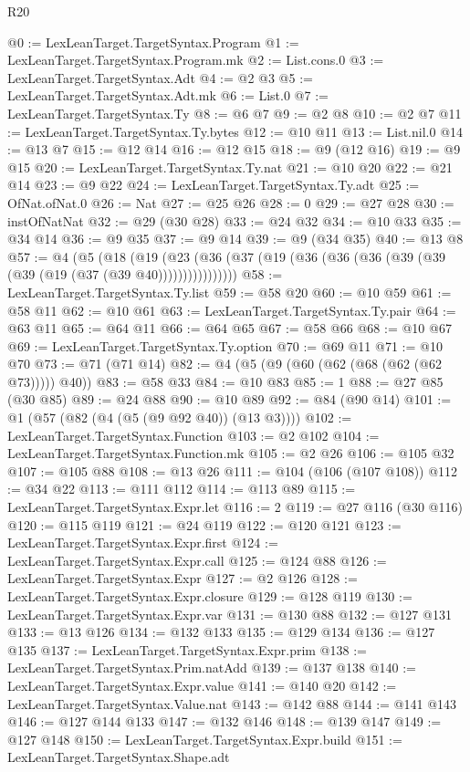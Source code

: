 \begin{lexlean}{R20}
\begin{coremodule}
@0 := LexLeanTarget.TargetSyntax.Program
@1 := LexLeanTarget.TargetSyntax.Program.mk
@2 := List.cons.{0}
@3 := LexLeanTarget.TargetSyntax.Adt
@4 := @2 @3
@5 := LexLeanTarget.TargetSyntax.Adt.mk
@6 := List.{0}
@7 := LexLeanTarget.TargetSyntax.Ty
@8 := @6 @7
@9 := @2 @8
@10 := @2 @7
@11 := LexLeanTarget.TargetSyntax.Ty.bytes
@12 := @10 @11
@13 := List.nil.{0}
@14 := @13 @7
@15 := @12 @14
@16 := @12 @15
@18 := @9 (@12 @16)
@19 := @9 @15
@20 := LexLeanTarget.TargetSyntax.Ty.nat
@21 := @10 @20
@22 := @21 @14
@23 := @9 @22
@24 := LexLeanTarget.TargetSyntax.Ty.adt
@25 := OfNat.ofNat.{0}
@26 := Nat
@27 := @25 @26
@28 := 0
@29 := @27 @28
@30 := instOfNatNat
@32 := @29 (@30 @28)
@33 := @24 @32
@34 := @10 @33
@35 := @34 @14
@36 := @9 @35
@37 := @9 @14
@39 := @9 (@34 @35)
@40 := @13 @8
@57 := @4
    (@5
      (@18 (@19 (@23 (@36 (@37 (@19 (@36 (@36 (@36 (@39 (@39 (@39 (@19 (@37 (@39 @40))))))))))))))))
@58 := LexLeanTarget.TargetSyntax.Ty.list
@59 := @58 @20
@60 := @10 @59
@61 := @58 @11
@62 := @10 @61
@63 := LexLeanTarget.TargetSyntax.Ty.pair
@64 := @63 @11
@65 := @64 @11
@66 := @64 @65
@67 := @58 @66
@68 := @10 @67
@69 := LexLeanTarget.TargetSyntax.Ty.option
@70 := @69 @11
@71 := @10 @70
@73 := @71 (@71 @14)
@82 := @4 (@5 (@9 (@60 (@62 (@68 (@62 (@62 @73))))) @40))
@83 := @58 @33
@84 := @10 @83
@85 := 1
@88 := @27 @85 (@30 @85)
@89 := @24 @88
@90 := @10 @89
@92 := @84 (@90 @14)
@101 := @1 (@57 (@82 (@4 (@5 (@9 @92 @40)) (@13 @3))))
@102 := LexLeanTarget.TargetSyntax.Function
@103 := @2 @102
@104 := LexLeanTarget.TargetSyntax.Function.mk
@105 := @2 @26
@106 := @105 @32
@107 := @105 @88
@108 := @13 @26
@111 := @104 (@106 (@107 @108))
@112 := @34 @22
@113 := @111 @112
@114 := @113 @89
@115 := LexLeanTarget.TargetSyntax.Expr.let
@116 := 2
@119 := @27 @116 (@30 @116)
@120 := @115 @119
@121 := @24 @119
@122 := @120 @121
@123 := LexLeanTarget.TargetSyntax.Expr.first
@124 := LexLeanTarget.TargetSyntax.Expr.call
@125 := @124 @88
@126 := LexLeanTarget.TargetSyntax.Expr
@127 := @2 @126
@128 := LexLeanTarget.TargetSyntax.Expr.closure
@129 := @128 @119
@130 := LexLeanTarget.TargetSyntax.Expr.var
@131 := @130 @88
@132 := @127 @131
@133 := @13 @126
@134 := @132 @133
@135 := @129 @134
@136 := @127 @135
@137 := LexLeanTarget.TargetSyntax.Expr.prim
@138 := LexLeanTarget.TargetSyntax.Prim.natAdd
@139 := @137 @138
@140 := LexLeanTarget.TargetSyntax.Expr.value
@141 := @140 @20
@142 := LexLeanTarget.TargetSyntax.Value.nat
@143 := @142 @88
@144 := @141 @143
@146 := @127 @144 @133
@147 := @132 @146
@148 := @139 @147
@149 := @127 @148
@150 := LexLeanTarget.TargetSyntax.Expr.build
@151 := LexLeanTarget.TargetSyntax.Shape.adt

\end{coremodule}
\end{lexlean}
